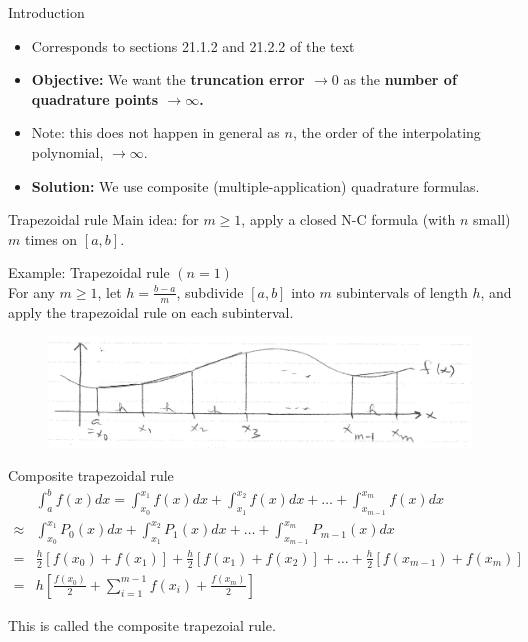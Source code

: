 \documentclass[12pt]{beamer}
\begin{document}
\begin{frame}{Introduction} 
\begin{itemize}
\item{Corresponds to sections 21.1.2 and 21.2.2 of the text}
\item{{\bf Objective:} We want the {\bf truncation error $\rightarrow 0$} as the {\bf number of quadrature points $\rightarrow \infty$.}}
\item{Note: this does not happen in general as $n$, the order of the interpolating polynomial, $\rightarrow \infty$.}
\item{{\bf Solution:} We use composite (multiple-application) quadrature formulas.} 
\end{itemize}
\end{frame} 

\begin{frame}{Trapezoidal rule} 
\noindent 
Main idea: for $m \geq 1$, apply a closed N-C formula (with $n$ small) $m$ times on $[a,b]$. 

\noindent 
Example: Trapezoidal rule $(n=1)$ 
\\
For any $m \geq 1$, let $h = \frac{b-a}{m}$, subdivide $[a,b]$ into $m$ subintervals of length $h$, and apply the trapezoidal rule on each subinterval. 


\begin{figure}[h] 
  \centering
  \includegraphics[scale=0.4]{composite_nc}
  \label{fig:composite_nc}
\end{figure}
\end{frame} 

\begin{frame}{Composite trapezoidal rule} 
\begin{align*} 
& \int_{a}^{b} f(x)dx = \int_{x_0}^{x_1}f(x)dx +  \int_{x_1}^{x_2}f(x)dx + \dots + \int_{x_{m-1}}^{x_m}f(x)dx \\ 
\approx & \int_{x_0}^{x_1}P_0(x)dx +  \int_{x_1}^{x_2}P_1(x)dx + \dots + \int_{x_{m-1}}^{x_m}P_{m-1}(x)dx \\
=& \frac{h}{2} \left [ f(x_0) + f(x_1) \right ] + \frac{h}{2} \left [ f(x_1) + f(x_2) \right ] + \dots + \frac{h}{2} \left [ f(x_{m-1}) + f(x_{m}) \right ] \\ 
=& h \left [ \frac{f(x_0)}{2} + \sum_{i=1}^{m-1} f(x_i) + \frac{f(x_m)}{2} \right ] 
\end{align*} 

This is called the composite trapezoial rule. 
\end{frame} 
\end{document}
